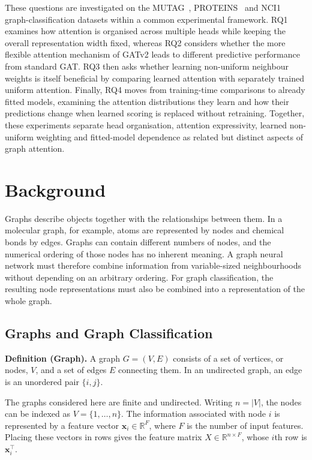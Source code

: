 \documentclass[11pt,a4paper]{article}
\begin{document}
\medskip
These questions are investigated on the MUTAG~\cite{debnath1991structure}, PROTEINS~\cite{borgwardt2005protein} and NCI1~\cite{wale2008comparison} graph-classification datasets within a common experimental framework. RQ1 examines how attention is organised across multiple heads while keeping the overall representation width fixed, whereas RQ2 considers whether the more flexible attention mechanism of GATv2 leads to different predictive performance from standard GAT. RQ3 then asks whether learning non-uniform neighbour weights is itself beneficial by comparing learned attention with separately trained uniform attention. Finally, RQ4 moves from training-time comparisons to already fitted models, examining the attention distributions they learn and how their predictions change when learned scoring is replaced without retraining. Together, these experiments separate head organisation, attention expressivity, learned non-uniform weighting and fitted-model dependence as related but distinct aspects of graph attention.






\clearpage
\section{Background}
\label{sec:background}

Graphs describe objects together with the relationships between them. In a molecular graph, for example, atoms are represented by nodes and chemical bonds by edges. Graphs can contain different numbers of nodes, and the numerical ordering of those nodes has no inherent meaning. A graph neural network must therefore combine information from variable-sized neighbourhoods without depending on an arbitrary ordering. For graph classification, the resulting node representations must also be combined into a representation of the whole graph.

\subsection{Graphs and Graph Classification}
\label{sec:graphs}

\medskip
\noindent\textbf{Definition (Graph).} A graph \(G=(V,E)\) consists of a set of vertices, or nodes, \(V\), and a set of edges \(E\) connecting them. In an undirected graph, an edge is an unordered pair \(\{i,j\}\).

The graphs considered here are finite and undirected. Writing \(n=|V|\), the nodes can be indexed as \(V=\{1,\ldots,n\}\). The information associated with node \(i\) is represented by a feature vector \(\mathbf{x}_i\in\mathbb{R}^{F}\), where \(F\) is the number of input features. Placing these vectors in rows gives the feature matrix \(X\in\mathbb{R}^{n\times F}\), whose \(i\)th row is \(\mathbf{x}_i^\top\).
\end{document}
